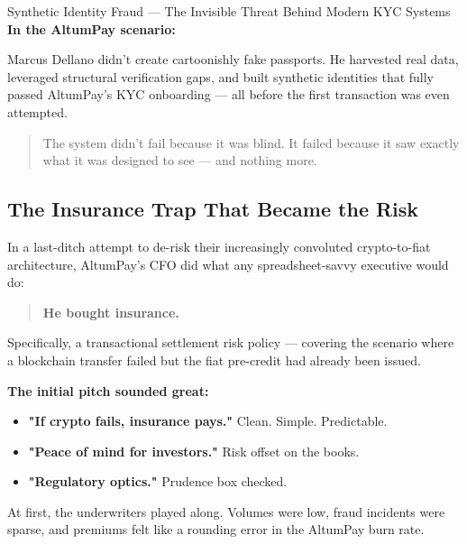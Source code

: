 \begin{HistoricalSidebar}{Synthetic Identity Fraud --- The Invisible Threat Behind Modern KYC Systems}
    \textbf{In the AltumPay scenario:}
    
    Marcus Dellano didn’t create cartoonishly fake passports.  
    He harvested real data, leveraged structural verification gaps, and built synthetic identities that fully passed AltumPay’s KYC onboarding — all before the first transaction was even attempted.
    
    \begin{quote}
    The system didn’t fail because it was blind.  
    It failed because it saw exactly what it was designed to see — and nothing more.
    \end{quote}
    
\end{HistoricalSidebar}







\bigskip

\subsection{The Insurance Trap That Became the Risk}

In a last-ditch attempt to de-risk their increasingly convoluted crypto-to-fiat architecture, AltumPay's CFO did what any spreadsheet-savvy executive would do:

\begin{quote}
\textbf{He bought insurance.}
\end{quote}

Specifically, a transactional settlement risk policy --- covering the scenario where a blockchain transfer failed but the fiat pre-credit had already been issued.

\medskip

\textbf{The initial pitch sounded great:}
\begin{itemize}
\item \textbf{"If crypto fails, insurance pays."} \quad Clean. Simple. Predictable.
\item \textbf{"Peace of mind for investors."} \quad Risk offset on the books.
\item \textbf{"Regulatory optics."} \quad Prudence box checked.
\end{itemize}

At first, the underwriters played along.
Volumes were low, fraud incidents were sparse, and premiums felt like a rounding error in the AltumPay burn rate.

\medskip

